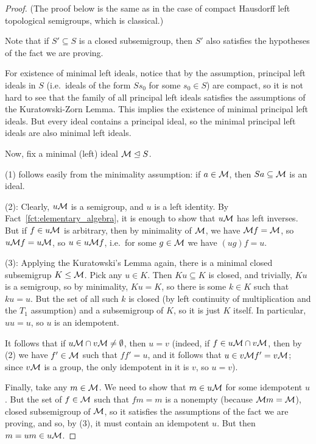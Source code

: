 	\begin{proof}
		(The proof below is the same as in the case of compact Hausdorff left topological semigroups, which is classical.)
		
		Note that if $S'\subseteq S$ is a closed subsemigroup, then $S'$ also satisfies the hypotheses of the fact we are proving.
		
		For existence of minimal left ideals, notice that by the assumption, principal left ideals in $S$ (i.e.\ ideals of the form $Ss_0$ for some $s_0\in S$) are compact, so it is not hard to see that the family of all principal left ideals satisfies the assumptions of the Kuratowski-Zorn Lemma. This implies the existence of minimal principal left ideals. But every ideal contains a principal ideal, so the minimal principal left ideals are also minimal left ideals.
		
		Now, fix a minimal (left) ideal ${\mathcal M}\trianglelefteq S$.
		
		(1) follows easily from the minimality assumption: if $a\in {\mathcal M}$, then $Sa\subseteq {\mathcal M}$ is an ideal.
		
		(2): Clearly, $u{\mathcal M}$ is a semigroup, and $u$ is a left identity. By Fact~\ref{fct:elementary_algebra}, it is enough to show that $u{\mathcal M}$ has left inverses. But if $f\in u{\mathcal M}$ is arbitrary, then by minimality of ${\mathcal M}$, we have ${\mathcal M} f={\mathcal M}$, so $u{\mathcal M} f=u{\mathcal M}$, so $u\in u{\mathcal M} f$, i.e.\ for some $g\in {\mathcal M}$ we have $(ug)f=u$.
		
		(3): Applying the Kuratowski's Lemma again, there is a minimal closed subsemigrup $K\leq {\mathcal M}$. Pick any $u\in K$. Then $Ku\subseteq K$ is closed, and trivially, $Ku$ is a semigroup, so by minimality, $Ku=K$, so there is some $k\in K$ such that $ku=u$. But the set of all such $k$ is closed (by left continuity of multiplication and the $T_1$ assumption) and a subsemigroup of $K$, so it is just $K$ itself. In particular, $uu=u$, so $u$ is an idempotent.
		
		It follows that if $u{\mathcal M}\cap v{\mathcal M}\neq \emptyset$, then $u=v$ (indeed, if $f\in u{\mathcal M}\cap v{\mathcal M}$, then by (2) we have $f'\in {\mathcal M}$ such that $ff'=u$, and it follows that $u\in v{\mathcal M} f'=v{\mathcal M}$; since $v{\mathcal M}$ is a group, the only idempotent in it is $v$, so $u=v$).
		
		Finally, take any $m\in {\mathcal M}$. We need to show that $m\in u{\mathcal M}$ for some idempotent $u$. But the set of $f\in {\mathcal M}$ such that $fm=m$ is a nonempty (because ${\mathcal M} m={\mathcal M}$), closed subsemigroup of ${\mathcal M}$, so it satisfies the assumptions of the fact we are proving, and so, by (3), it must contain an idempotent $u$. But then $m=um\in u{\mathcal M}$.
		

\end{proof}
